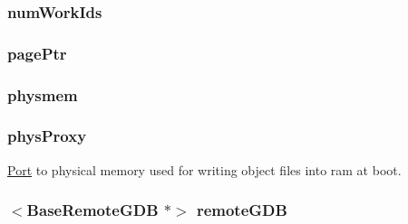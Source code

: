 \label{classSystem_a1adea9b3072c7e8d2d045b275c8e37e7}
\hypertarget{classSystem_a582d58a54a49964f2967b70bcd29f89d}{
\subsubsection[{numWorkIds}]{ {\bf numWorkIds}}}
\label{classSystem_a582d58a54a49964f2967b70bcd29f89d}
\hypertarget{classSystem_aeeee662e637858aeeb38ca8b84a115cb}{
\subsubsection[{pagePtr}]{ {\bf pagePtr}}}
\label{classSystem_aeeee662e637858aeeb38ca8b84a115cb}
\hypertarget{classSystem_aefd0d5534ce05a7596afe30efe297ad8}{
\subsubsection[{physmem}]{ {\bf physmem}}}
\label{classSystem_aefd0d5534ce05a7596afe30efe297ad8}
\hypertarget{classSystem_a6219b40ecb92ec67602ae32c1ae2c0d6}{
\subsubsection[{physProxy}]{ {\bf physProxy}}}
\label{classSystem_a6219b40ecb92ec67602ae32c1ae2c0d6}
\hyperlink{classPort}{Port} to physical memory used for writing object files into ram at boot. \hypertarget{classSystem_a0bb92fde095f717f1a9709fa16825091}{
\subsubsection[{remoteGDB}]{$<${\bf BaseRemoteGDB} $\ast$$>$ {\bf remoteGDB}}}
